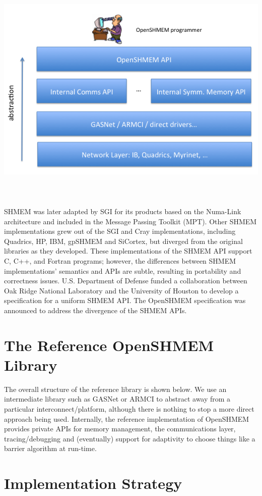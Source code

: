 \documentclass[english]{article}
\begin{document}
SHMEM was later adapted by SGI for its products based on the Numa-Link
architecture and included in the Message Passing Toolkit (MPT). Other
SHMEM implementations grew out of the SGI and Cray implementations,
including Quadrics, HP, IBM, gpSHMEM and SiCortex, but diverged from
the original libraries as they developed. These implementations of the
SHMEM API support C, C++, and Fortran programs; however, the
differences between SHMEM implementations' semantics and APIs are
subtle, resulting in portability and correctness
issues. U.S. Department of Defense funded a collaboration between Oak
Ridge National Laboratory and the University of Houston to develop a
specification for a uniform SHMEM API. The OpenSHMEM specification was
announced to address the divergence of the SHMEM APIs.

\section{The Reference OpenSHMEM Library}

The overall structure of the reference library is shown below. We use
an intermediate library such as GASNet or ARMCI to abstract away from
a particular interconnect/platform, although there is nothing to stop
a more direct approach being used. Internally, the reference
implementation of OpenSHMEM provides private APIs for memory
management, the communications layer, tracing/debugging and
(eventually) support for adaptivity to choose things like a barrier
algorithm at run-time.

\medskip{}

\title{\includegraphics[scale=0.5]{implementation}}

\section{Implementation Strategy}
\end{document}

